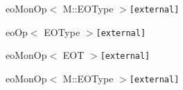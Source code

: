\begin{CompactList}
\begin{CompactList}
\begin{CompactList}
\item eoMonOp$<$ M::EOType $>${\tt  [external]}\end{CompactList}
\end{CompactList}
\item eoOp$<$ EOType $>${\tt  [external]}\begin{CompactList}
\item eoMonOp$<$ EOT $>${\tt  [external]}\item eoMonOp$<$ M::EOType $>${\tt  [external]}\end{CompactList}
\item {}
\item {}
\item {}
\item {}
\end{CompactList}
